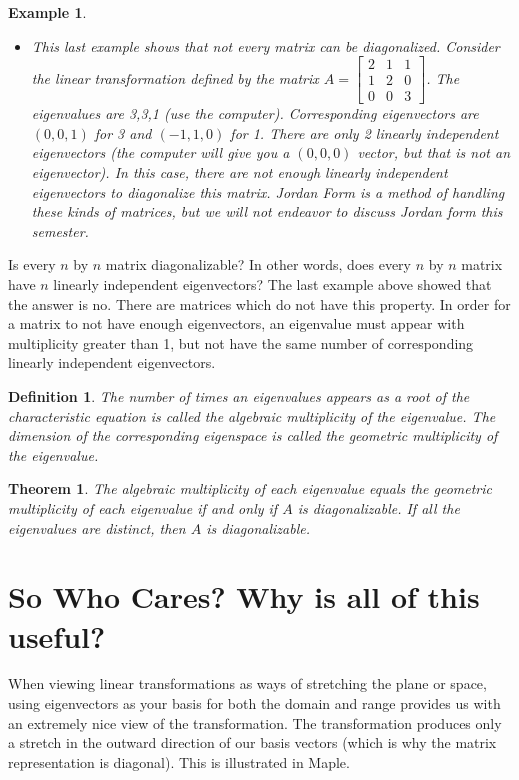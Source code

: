 \documentclass[10pt]{article}
\theoremstyle{plain}
\newtheorem{theorem}{Theorem}\newtheorem*{theorem*}{Theorem}
\theoremstyle{box}
\newtheorem{definition}{Definition}
\newtheorem{example}{Example}
\begin{document}
\begin{example}
\begin{itemize}
\item
This last example shows that not every matrix can be diagonalized.  
Consider the linear transformation defined by the matrix
$A=  
\begin{bmatrix}
 2 & 1 & 1 \\
 1 & 2 & 0 \\
 0 & 0 & 3
\end{bmatrix} 
$. The eigenvalues are 3,3,1 (use the computer). Corresponding eigenvectors are $(0,0,1)$ for 3 and $(-1,1,0)$ for 1. There are only 2 linearly independent eigenvectors (the computer will give you a $(0,0,0)$ vector, but that is not an eigenvector).  In this case, there are not enough linearly independent eigenvectors to diagonalize this matrix.  Jordan Form is a method of handling these kinds of matrices, but we will not endeavor to discuss Jordan form this semester. 

\end{itemize}
\end{example}








Is every $n$ by $n$ matrix diagonalizable?  In other words, does every $n$ by $n$ matrix have $n$ linearly independent eigenvectors? The last example above showed that the answer is no. There are matrices which do not have this property. In order for a matrix to not have enough eigenvectors, an eigenvalue must appear with multiplicity greater than 1, but not have the same number of corresponding linearly independent eigenvectors. 
\begin{definition}
The number of times an eigenvalues appears as a root of the characteristic equation is called the algebraic multiplicity of the eigenvalue.  The dimension of the corresponding eigenspace is called the geometric multiplicity of the eigenvalue. 
\end{definition}
\begin{theorem}
The algebraic multiplicity of each eigenvalue equals the geometric multiplicity of each eigenvalue if and only if $A$ is diagonalizable. If all the eigenvalues are distinct, then $A$ is diagonalizable.
\end{theorem}

\section{So Who Cares? Why is all of this useful?}
When viewing linear transformations as ways of stretching the plane or space, using eigenvectors as your basis for both the domain and range provides us with an extremely nice view of the transformation.  The transformation produces only a stretch in the outward direction of our basis vectors (which is why the matrix representation is diagonal).  This is illustrated in Maple.
\end{document}
